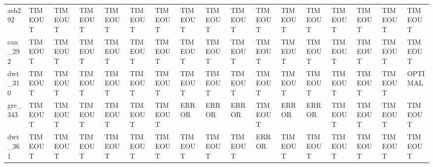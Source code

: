 \begin{tabular}{lllllllllllllllll}
ash292 & TIMEOUT & TIMEOUT & TIMEOUT & TIMEOUT & TIMEOUT & TIMEOUT & TIMEOUT & TIMEOUT & TIMEOUT & TIMEOUT & TIMEOUT & TIMEOUT & TIMEOUT & TIMEOUT & TIMEOUT & TIMEOUT \\
can\_292 & TIMEOUT & TIMEOUT & TIMEOUT & TIMEOUT & TIMEOUT & TIMEOUT & TIMEOUT & TIMEOUT & TIMEOUT & TIMEOUT & TIMEOUT & TIMEOUT & TIMEOUT & TIMEOUT & TIMEOUT & TIMEOUT \\
dwt\_310 & TIMEOUT & TIMEOUT & TIMEOUT & TIMEOUT & TIMEOUT & TIMEOUT & TIMEOUT & TIMEOUT & TIMEOUT & TIMEOUT & TIMEOUT & TIMEOUT & TIMEOUT & TIMEOUT & TIMEOUT & OPTIMAL \\
gre\_343 & TIMEOUT & TIMEOUT & TIMEOUT & TIMEOUT & TIMEOUT & TIMEOUT & ERROR & ERROR & ERROR & TIMEOUT & ERROR & ERROR & TIMEOUT & TIMEOUT & TIMEOUT & TIMEOUT \\
dwt\_361 & TIMEOUT & TIMEOUT & TIMEOUT & TIMEOUT & TIMEOUT & TIMEOUT & TIMEOUT & TIMEOUT & TIMEOUT & ERROR & TIMEOUT & TIMEOUT & TIMEOUT & TIMEOUT & TIMEOUT & TIMEOUT \\
\hline
\end{tabular}

